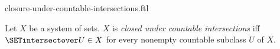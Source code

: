 \documentclass{naproche-library}
\begin{document}
\begin{smodule}[title=Closure Under Countable Intersections]{closure-under-countable-intersections.ftl}

\begin{definition}[forthel,id=FOUNDATIONS_14_451771879129088]
  Let $X$ be a system of sets.
  $X$ is \emph{closed under countable intersections} iff $\SETintersectover U \in X$ for every nonempty countable subclass $U$ of $X$.
\end{definition}
\end{smodule}
\end{document}
